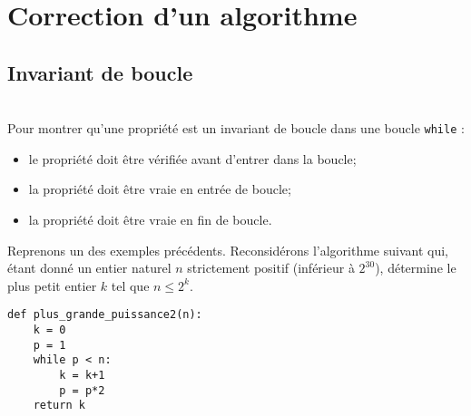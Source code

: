 \section{Correction d'un algorithme}
\subsection{Invariant de boucle}

\begin{methode}~\\
Pour montrer qu'une propriété est un invariant de boucle dans une boucle \texttt{while} :
\begin{itemize}
\item le propriété doit être vérifiée avant d'entrer dans la boucle;
\item la propriété doit être vraie en entrée de boucle;
\item la propriété doit être vraie en fin de boucle.
\end{itemize}
\end{methode}
%


Reprenons un des exemples précédents. Reconsidérons l’algorithme suivant qui, étant donné un entier naturel $n$ strictement positif (inférieur à $2^{30}$), détermine le plus petit entier $k$ tel que $n \leq 2^k$.
\begin{lstlisting}
def plus_grande_puissance2(n):
    k = 0
    p = 1
    while p < n:
        k = k+1
        p = p*2
    return k
\end{lstlisting}

